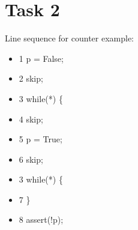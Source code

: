 \chapter{Task 2}
\label{cha:task2}

Line sequence for counter example:
\begin{itemize}
\item 1 p = False;
\item 2 skip;
\item 3 while(*) \{
\item 4 skip;
\item 5 p = True;
\item 6 skip;
\item 3 while(*) \{
\item 7 \}
\item 8 assert(!p);
\end{itemize}
